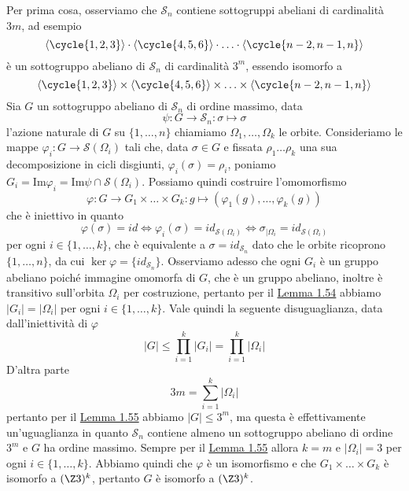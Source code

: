 \documentclass[11pt]{scrartcl}
\begin{document}
\begin{soln}
    Per prima cosa, osserviamo che $\mathcal{S}_n$ contiene sottogruppi abeliani di
    cardinalità $3m$, ad esempio
    \[
        \langle\cycle{1, 2, 3}\rangle\cdot \langle\cycle{4, 5, 6}\rangle
        \cdot \ldots \cdot \langle\cycle{n - 2, n - 1, n}\rangle
    \]
    è un sottogruppo abeliano di $\mathcal{S}_n$ di cardinalità $3^m$, essendo 
    isomorfo a
    \[
        \langle\cycle{1, 2, 3}\rangle\times\langle\cycle{4, 5, 6}\rangle
        \times\ldots\times\langle\cycle{n - 2, n - 1, n}\rangle
    \]
    Sia $G$ un sottogruppo abeliano di $\mathcal{S}_n$ di ordine massimo, data
    \[
        \psi: G\longrightarrow \mathcal{S}_n : \sigma \longmapsto \sigma
    \]
    l'azione naturale di $G$ su $\{1, \ldots, n\}$ chiamiamo $\Omega_1, \ldots, \Omega_k$
    le orbite. Consideriamo le mappe $\varphi_i : G \longrightarrow \mathcal{S}(\Omega_i)$
    tali che, data $\sigma \in G$ e fissata $\rho_1\ldots\rho_k$ una sua decomposizione
    in cicli disgiunti, $\varphi_i(\sigma) = \rho_i$, poniamo $G_i = \mathrm{Im}\varphi_i=
    \mathrm{Im}\psi \cap \mathcal{S}(\Omega_i)$. Possiamo quindi costruire l'omomorfismo
    \[
        \varphi: G \longrightarrow G_1\times \ldots \times G_k : g \longmapsto (\varphi_1(g), \ldots, \varphi_k(g))
    \]
    che è iniettivo in quanto 
    \[
        \varphi(\sigma) = id \iff \varphi_i(\sigma) = id_{\mathcal{S}(\Omega_i)} \iff 
        \sigma_{\mid \Omega_i} = id_{\mathcal{S}(\Omega_i)}
    \]
    per ogni $i \in \{1, \ldots, k\}$, che è equivalente a $\sigma = id_{\mathcal{S}_n}$
    dato che le orbite ricoprono $\{1, \ldots, n\}$, da cui $\ker\varphi = 
    \{id_{\mathcal{S}_n}\}$. Osserviamo adesso che ogni $G_i$ è un gruppo abeliano poiché
    immagine omomorfa di $G$, che è un gruppo abeliano, inoltre è transitivo
    sull'orbita $\Omega_i$ per costruzione, pertanto per il 
    \hyperref[lemma1.54]{Lemma 1.54} abbiamo $|G_i| = |\Omega_i|$ per ogni 
     $i \in \{1, \ldots, k\}$. Vale quindi la seguente disuguaglianza, data
    dall'iniettività di $\varphi$
    \[
        |G| \leqslant \prod_{i = 1}^k|G_i| = \prod_{i = 1}^k |\Omega_i|
    \]
    D'altra parte
    \[
        3m = \sum_{i = 1}^k|\Omega_i|
    \]pertanto per il \hyperref[lemma1.55]{Lemma 1.55} abbiamo $|G| \leq 3^m$, 
    ma questa è effettivamente un'uguaglianza in quanto $\mathcal{S}_n$ contiene
    almeno un sottogruppo abeliano di ordine $3^m$ e $G$ ha ordine massimo.
    Sempre per il \hyperref[lemma1.55]{Lemma 1.55} allora $k = m$ e $|\Omega_i| = 3$
    per ogni $i \in \{1, \ldots, k\}$. Abbiamo quindi che $\varphi$ è un isomorfismo
    e che $G_1\times\ldots\times G_k$ è isomorfo a $(\Z3)^k$, pertanto
    $G$ è isomorfo a $(\Z3)^k$.
\end{soln}
\end{document}
